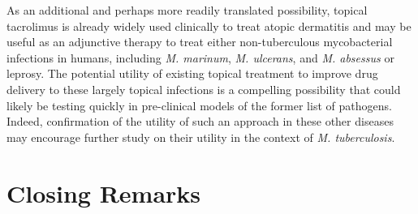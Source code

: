 As an additional and perhaps more readily translated possibility, topical tacrolimus is already widely used clinically to treat atopic dermatitis and may be useful as an adjunctive therapy to treat either non-tuberculous mycobacterial infections in humans, including \textit{M. marinum}, \textit{M. ulcerans}, and \textit{M. absessus} or leprosy. The potential utility of existing topical treatment to improve drug delivery to these largely topical infections is a compelling possibility that could likely be testing quickly in pre-clinical models of the former list of pathogens. Indeed, confirmation of the utility of such an approach in these other diseases may encourage further study on their utility in the context of \textit{M. tuberculosis}.

\section{Closing Remarks}


